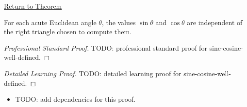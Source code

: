 \newpage
{}
\label{prf:sine-cosine-well-defined}

\begin{remark*}[Return]
\hyperref[thm:sine-cosine-well-defined]{Return to Theorem}
\end{remark*}

\begin{theorem*}
For each acute Euclidean angle $\theta$, the values $\sin\theta$ and
\(\cos\theta\) are independent of the right triangle chosen to compute them.
\end{theorem*}

\begin{proof}[Professional Standard Proof]
\LRAProofBodyStart
TODO: professional standard proof for sine-cosine-well-defined.
\end{proof}

\begin{proof}[Detailed Learning Proof]
\LRAProofBodyStart
TODO: detailed learning proof for sine-cosine-well-defined.
\end{proof}

\begin{remark*}
\end{remark*}

\begin{dependencies}
\begin{itemize}
  \item TODO: add dependencies for this proof.
\end{itemize}
\end{dependencies}

\clearpage
